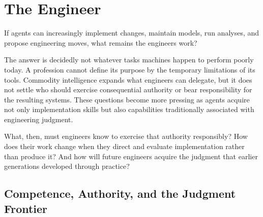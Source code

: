 


\chapter{The Engineer}

If agents can increasingly implement changes, maintain models, run analyses, and propose engineering moves, what remains the engineer\textquotesingle s work?

The answer is decidedly not whatever tasks machines happen to perform poorly today. A profession cannot define its purpose by the temporary limitations of its tools. Commodity intelligence expands what engineers can delegate, but it does not settle who should exercise consequential authority or bear responsibility for the resulting systems. These questions become more pressing as agents acquire not only implementation skills but also capabilities traditionally associated with engineering judgment.

What, then, must engineers know to exercise that authority responsibly? How does their work change when they direct and evaluate implementation rather than produce it? And how will future engineers acquire the judgment that earlier generations developed through practice?

\section{Competence, Authority, and the Judgment Frontier}\label{heading:authority-follows-competence-and-responsibility}


